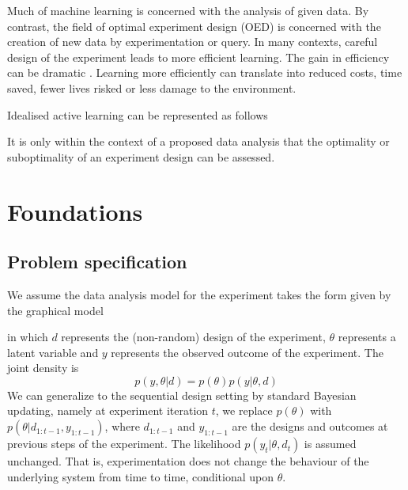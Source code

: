 Much of machine learning is concerned with the analysis of given data. By contrast, the field of optimal experiment design (OED) is concerned with the creation of new data by experimentation or query. In many contexts, careful design of the experiment leads to more efficient learning. The gain in efficiency can be dramatic \cite{myung2013}. Learning more efficiently can translate into reduced costs, time saved, fewer lives risked or less damage to the environment.

Idealised active learning can be represented as follows
\begin{center}
\end{center}
It is only within the context of a proposed data analysis that the optimality or suboptimality of an experiment design can be assessed.

\section{Foundations}
\subsection{Problem specification}
We assume the data analysis model for the experiment takes the form given by the graphical model
\begin{center}
\end{center}
in which $d$ represents the (non-random) design of the experiment, $\theta$ represents a latent variable and $y$ represents the observed outcome of the experiment. The joint density is
\begin{equation}
	p(y, \theta | d) = p(\theta)p(y|\theta,d)
\end{equation}
We can generalize to the sequential design setting by 
standard Bayesian updating, namely at experiment iteration $t$, we replace $p(\theta)$ with 
$p(\theta | d_{1:t-1}, y_{1:t-1})$, where $d_{1:t-1}$ and  $y_{1:t-1}$ are the designs and outcomes at previous steps of the experiment.
The likelihood $p(y_t | \theta, d_t)$ is assumed unchanged. That is, experimentation does not change the behaviour of the underlying system from time to time, conditional upon $\theta$.

